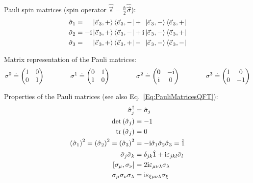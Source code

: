		\noindent
		Pauli spin matrices (spin operator $\hat{\vec{s}} = \frac{\hbar}{2} \hat{\vec{\sigma}}$):
		\begin{equation}
			\begin{aligned}
				\hat{\sigma}_1 &= \phantom{-\i}\Ket{\vec{e}_3,+} \Bra{\vec{e}_3,-} + \phantom{\i}\Ket{\vec{e}_3,-} \Bra{\vec{e}_3,+} \\
				\hat{\sigma}_2 &= -\i\Ket{\vec{e}_3,+} \Bra{\vec{e}_3,-} + \i\Ket{\vec{e}_3,-} \Bra{\vec{e}_3,+} \\
				\hat{\sigma}_3 &= \phantom{-\i}\Ket{\vec{e}_3,+} \Bra{\vec{e}_3,+} - \phantom{\i}\Ket{\vec{e}_3,-} \Bra{\vec{e}_3,-} \\
			\end{aligned}
		\end{equation}

		\noindent
		Matrix representation of the Pauli matrices:
		\begin{equation}
			\label{Eq:PauliMatricesQFT}
			\begin{aligned}
				\sigma^0 \doteq \mqty(
					1 & 0 \\
					0 & 1 \\
				) &&\hsp
				\sigma^1 \doteq \mqty(
					0 & 1 \\
					1 & 0 \\
				) &&\hsp
				\sigma^2 \doteq \mqty(
					0 & -\i \\
						\i & 0 \\
				) &&\hsp
				\sigma^3 \doteq \mqty(
					1 & 0 \\
					0 & -1 \\
				)
			\end{aligned}
		\end{equation}

		\noindent
		Properties of the Pauli matrices (see also Eq.~\ref{Eq:PauliMatricesQFT}):
		\begin{equation}
			\label{Eq:PauliMatrices}
			\begin{aligned}
				\hat{\sigma}_j^\dagger &= \hat{\sigma}_j \\
				\det\qty(\hat{\sigma}_j) &= -1 \\
				\tr\qty(\hat{\sigma}_j) &= 0 \\
				\qty(\hat{\sigma}_1)^2 = \qty(\hat{\sigma}_2)^2 = \qty(\hat{\sigma}_3)^2 &= -\i\hat{\sigma}_1\hat{\sigma}_2\hat{\sigma}_3 = \hat{1} \\
				\hat{\sigma}_j \hat{\sigma}_k &= \delta_{jk}\hat{1} + \i\levicivita{jkl}\hat{\sigma}_l \\
				\comm{\sigma_\mu}{\sigma_\nu} &= 2\i\levicivita{\mu\nu\lambda}\sigma_\lambda \\
				\sigma_\mu \sigma_\nu \sigma_\lambda &= \i\levicivita{\xi\mu\nu\lambda}\sigma_\xi \\
			\end{aligned}
		\end{equation}

